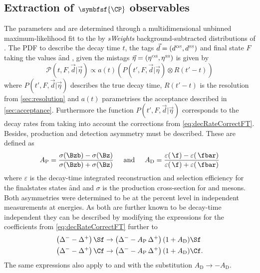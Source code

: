 \subsection[head={Extraction of \CP observables},tocentry={Extraction of \CP observables}]{Extraction of $\symbfsf{\CP}$ observables}
\label{sec:ExtractCPobs}

The \CP parameters \Sf and \Sfbar are determined through a multidimensional unbinned maximum-likelihood fit to the by \emph{sWeights} background-subtracted distributions of \BdToDpi.
The PDF to describe the decay time $t$, the tags $\vec{d}=(d^{\text{\tiny OS}}, d^{\text{\tiny SS}})$ and final state $F$ taking the values \f and \fbar, given the mistags $\vec{\eta}=(\eta^{\text{\tiny OS}}, \eta^{\text{\tiny SS}})$ is given by
\begin{equation}
\mathcal{P}(t, F, \vec{d}|\vec{\eta})\propto a(t)\left(P(t', F, \vec{d}|\vec{\eta})\otimes R(t'-t)\right)
\end{equation}
where $P(t', F, \vec{d}|\vec{\eta})$ describes the true decay time, $R(t'-t)$ is the resolution from \cref{sec:resolution} and $a(t)$ parametrises the acceptance described in \cref{sec:acceptance}.
Furthermore the function $P(t', F, \vec{d}|\vec{\eta})$ corresponds to the decay rates from  taking into account the corrections from \cref{eq:decRateCorrectFT}.
Besides, production and detection asymmetry must be described.
These are defined as
\begin{equation}
A_{\text{P}}=\frac{\sigma(\Bzb)-\sigma(\Bz)}{\sigma(\Bzb)+\sigma(\Bz)}\hspace{0.5cm}\text{and}\hspace{0.5cm}A_{\text{D}}=\frac{\varepsilon(\,\f)-\varepsilon(\,\fbar)}{\varepsilon(\,\f)+\varepsilon(\,\fbar)}
\end{equation}
where $\varepsilon$ is the decay-time integrated reconstruction and selection efficiency for the finalstates states \f and \fbar and $\sigma$ is the production cross-section for \Bz and \Bzb mesons.
Both asymmetries were determined to be at the percent level in independent measurements at \lhc energies.
As both are further known to be decay-time independent they can be described by modifying the expressions for the \CP coefficients from \cref{eq:decRateCorrectFT} further to
\begin{equation}
\begin{aligned}
\left(\Delta^--\Delta^+\right)\Sf&\to\left(\Delta^--A_{\text{P}}\,\Delta^+\right)(1+A_{\text{D}})\Sf\\
\left(\Delta^--\Delta^+\right)\Cf&\to\left(\Delta^--A_{\text{P}}\,\Delta^+\right)(1+A_{\text{D}})\Cf.
\end{aligned}
\end{equation}
The same expressions also apply to \Sfbar and \Cfbar with the substitution $A_{\text{D}}\to -A_{\text{D}}$.

